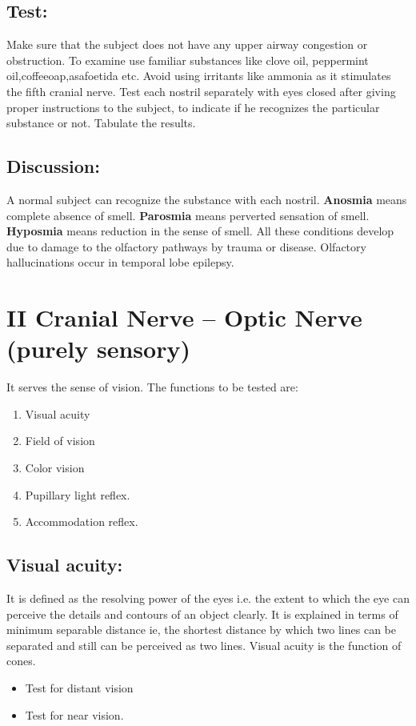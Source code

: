 \documentclass[a4paper,12pt,openany,oneside]{book}
\begin{document}
\subsection*{Test:}
Make sure that the subject does not have any upper airway congestion or obstruction. To examine use familiar substances like clove oil, peppermint oil,coffeeoap,asafoetida etc. Avoid using irritants like ammonia as it stimulates the fifth cranial nerve.
Test each nostril separately with eyes closed after giving proper instructions to the subject, to indicate if he recognizes the particular substance or not. Tabulate the results.
\subsection*{Discussion:}
A normal subject can recognize the substance with each nostril.
	\textbf{Anosmia} means complete absence of smell. \textbf{Parosmia} means perverted sensation of smell. \textbf{Hyposmia} means reduction in the sense of smell. All these conditions develop due to damage to the olfactory pathways by trauma or disease. Olfactory hallucinations occur in temporal lobe epilepsy.

		\section*{II Cranial Nerve – Optic Nerve (purely sensory)}
		It serves the sense of vision. The functions to be tested are:
		\begin{enumerate}
\item{Visual acuity}
\item{Field of vision}
\item{Color vision}
\item{Pupillary light reflex.}
\item{Accommodation reflex.}
		\end{enumerate}
		\subsection*{Visual acuity:}
		It is defined as the resolving power of the eyes i.e. the extent to which the eye can perceive the details and contours of an object clearly. It is explained in terms of minimum separable distance ie, the shortest distance by which two lines can be separated and still can be perceived as two lines. Visual acuity is the function of cones.
		\begin{itemize}
			\item[]Test for distant vision
			\item[]Test for near vision.
		\end{itemize}
\end{document}
